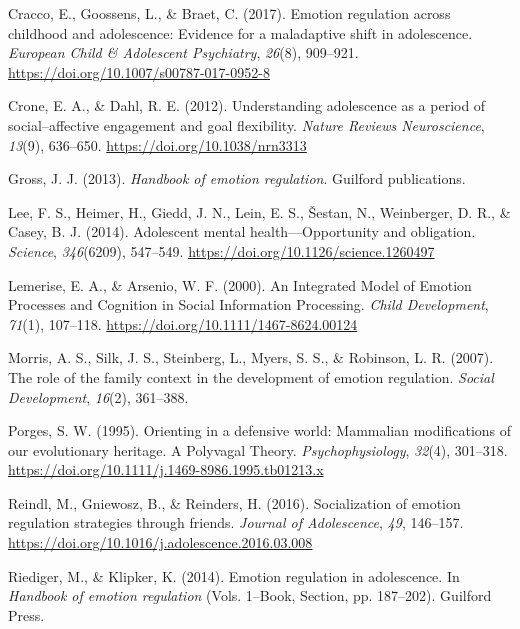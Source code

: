 \documentclass[
  english,
  man]{apa6}
\begin{document}
\leavevmode\hypertarget{ref-craccoEmotionRegulationChildhood2017}{}%
Cracco, E., Goossens, L., \& Braet, C. (2017). Emotion regulation across childhood and adolescence: Evidence for a maladaptive shift in adolescence. \emph{European Child \& Adolescent Psychiatry}, \emph{26}(8), 909--921. \url{https://doi.org/10.1007/s00787-017-0952-8}

\leavevmode\hypertarget{ref-croneUnderstandingAdolescencePeriod2012}{}%
Crone, E. A., \& Dahl, R. E. (2012). Understanding adolescence as a period of social--affective engagement and goal flexibility. \emph{Nature Reviews Neuroscience}, \emph{13}(9), 636--650. \url{https://doi.org/10.1038/nrn3313}

\leavevmode\hypertarget{ref-grossHandbookEmotionRegulation2013}{}%
Gross, J. J. (2013). \emph{Handbook of emotion regulation}. Guilford publications.

\leavevmode\hypertarget{ref-leeAdolescentMentalHealth2014}{}%
Lee, F. S., Heimer, H., Giedd, J. N., Lein, E. S., Šestan, N., Weinberger, D. R., \& Casey, B. J. (2014). Adolescent mental health---Opportunity and obligation. \emph{Science}, \emph{346}(6209), 547--549. \url{https://doi.org/10.1126/science.1260497}

\leavevmode\hypertarget{ref-lemeriseIntegratedModelEmotion2000}{}%
Lemerise, E. A., \& Arsenio, W. F. (2000). An Integrated Model of Emotion Processes and Cognition in Social Information Processing. \emph{Child Development}, \emph{71}(1), 107--118. \url{https://doi.org/10.1111/1467-8624.00124}

\leavevmode\hypertarget{ref-morrisRoleFamilyContext2007}{}%
Morris, A. S., Silk, J. S., Steinberg, L., Myers, S. S., \& Robinson, L. R. (2007). The role of the family context in the development of emotion regulation. \emph{Social Development}, \emph{16}(2), 361--388.

\leavevmode\hypertarget{ref-porgesOrientingDefensiveWorld1995}{}%
Porges, S. W. (1995). Orienting in a defensive world: Mammalian modifications of our evolutionary heritage. A Polyvagal Theory. \emph{Psychophysiology}, \emph{32}(4), 301--318. \url{https://doi.org/10.1111/j.1469-8986.1995.tb01213.x}

\leavevmode\hypertarget{ref-reindlSocializationEmotionRegulation2016}{}%
Reindl, M., Gniewosz, B., \& Reinders, H. (2016). Socialization of emotion regulation strategies through friends. \emph{Journal of Adolescence}, \emph{49}, 146--157. \url{https://doi.org/10.1016/j.adolescence.2016.03.008}

\leavevmode\hypertarget{ref-riedigerEmotionRegulationAdolescence2014}{}%
Riediger, M., \& Klipker, K. (2014). Emotion regulation in adolescence. In \emph{Handbook of emotion regulation} (Vols. 1--Book, Section, pp. 187--202). Guilford Press.
\end{document}

